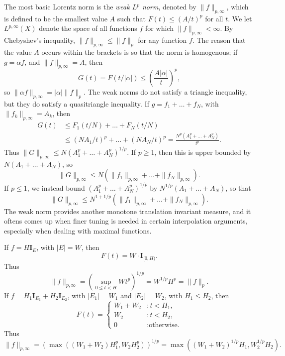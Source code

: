 The most basic Lorentz norm is the \emph{weak $L^p$ norm}, denoted by $\| f \|_{p,\infty}$, which is defined to be the smallest value $A$ such that $F(t) \leq (A/t)^p$ for all $t$. We let $L^{p,\infty}(X)$ denote the space of all functions $f$ for which $\| f \|_{p,\infty} < \infty$. By Chebyshev's inequality, $\| f \|_{p,\infty} \leq \| f \|_p$ for any function $f$. The reason that the value $A$ occurs within the brackets is so that the norm is homogenous; if $g = \alpha f$, and $\| f \|_{p,\infty} = A$, then
%
\[ G(t) = F(t/|\alpha|) \leq \left( \frac{A |\alpha|}{t} \right)^p, \]
%
so $\| \alpha f \|_{p,\infty} = |\alpha| \| f \|_p$. The weak norms do not satisfy a triangle inequality, but they do satisfy a quasitriangle inequality. If $g = f_1 + \dots + f_N$, with $\| f_k \|_{p,\infty} = A_k$, then
%
\begin{align*}
    G(t) &\leq F_1(t/N) + \dots + F_N(t/N)\\
    &\leq (NA_1/t)^p + \dots + (NA_N/t)^p = \frac{N^p(A_1^p + \dots + A_N^p)}{t^p}.
\end{align*}
%
Thus $\| G \|_{p,\infty} \leq N(A_1^p + \dots + A_N^p)^{1/p}$. If $p \geq 1$, then this is upper bounded by $N(A_1 + \dots + A_N)$, so
%
\[ \| G \|_{p,\infty} \leq N \left( \| f_1 \|_{p,\infty} + \dots + \| f_N \|_{p,\infty} \right). \]
%
If $p \leq 1$, we instead bound $(A_1^p + \dots + A_N^p)^{1/p}$ by $N^{1/p}(A_1 + \dots + A_N)$, so that
%
\[ \| G \|_{p,\infty} \leq N^{1 + 1/p} \left( \| f_1 \|_{p,\infty} + \dots + \| f_N \|_{p,\infty} \right). \]
%
The weak norm provides another monotone translation invariant measure, and it oftens comes up when finer tuning is needed in certain interpolation arguments, especially when dealing with maximal functions.

\begin{example}
  If $f = H \mathbf{I}_E$, with $|E| = W$, then
  \[ F(t) = W \cdot \mathbf{I}_{[0,H)}. \]
  Thus
  \[ \| f \|_{p,\infty} = \left( \sup_{0 \leq t < H} W t^p \right)^{1/p} = W^{1/p} H^p = \| f \|_p. \]
  If $f = H_1 \mathbf{I}_{E_1} + H_2 \mathbf{I}_{E_2}$, with $|E_1| = W_1$ and $|E_2| = W_2$, with $H_1 \leq H_2$, then
  \[ F(t) = \begin{cases} W_1 + W_2 &: t < H_1, \\ W_2 &: t < H_2, \\ 0 &: \text{otherwise.} \end{cases} \]
  Thus
  \[ \| f \|_{p,\infty} = \left( \max((W_1 + W_2) H_1^p, W_2 H_2^p) \right)^{1/p} = \max((W_1 + W_2)^{1/p} H_1, W_2^{1/p} H_2). \]
\end{example}

